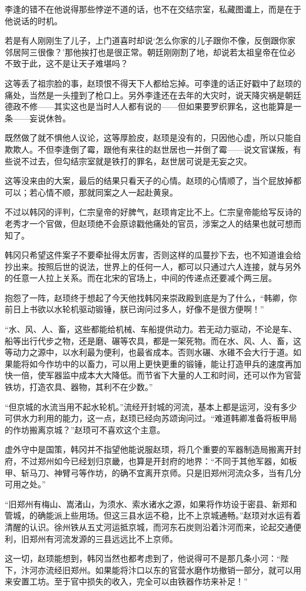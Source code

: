 李逢的错不在他说得那些悖逆不道的话，也不在交结宗室，私藏图谶上，而是在于他说话的时机。

若是有人刚刚生了儿子，上门道喜时却说‘怎么你家的儿子跟你不像，反倒跟你家邻居阿三很像？’那他挨打也是很正常。朝廷刚刚割了地，却说若太祖皇帝在位必不致于此，这不是让天子难堪吗？

这等丢了祖宗脸的事，赵顼恨不得天下人都给忘掉。可李逢的话正好戳中了赵顼的痛处，当然是一头撞到了枪口上。另外李逢还在去年的大灾时，说天降灾祸是朝廷德政不修——其实这也是当时人人都有说的——但如果要罗织罪名，这也能算是一条——妄说休咎。

既然做了就不惧他人议论，这等厚脸皮，赵顼是没有的，只因他心虚，所以只能自欺欺人。不但李逢倒了霉，跟他有来往的赵世居也一并倒了霉——说文官谋叛，有些说不过去，但勾结宗室就是铁打的罪名，赵世居可说是无妄之灾。

这等没来由的大案，最后的结果只看天子的心情。赵顼的心情顺了，当个屁放掉都可以；若心情不顺，那就同案之人一起赴黄泉。

不过以韩冈的评判，仁宗皇帝的好脾气，赵顼肯定比不上。仁宗皇帝能给写反诗的老秀才一个官做，但赵顼绝不会原谅戳他痛处的官员，涉案之人的结果也就可想而知了。

韩冈只希望这件案子不要牵扯得太厉害，否则这样的瓜蔓抄下去，也不知道谁会给抄出来。按照后世的说法，世界上的任何一人，都可以只通过六人连接，就与另外的任意一人拉上关系。而在北宋的官场上，中间的传递点还要减个两三层。

抱怨了一阵，赵顼终于想起了今天他找韩冈来崇政殿到底是为了什么，“韩卿，你前日上书欲以水轮机驱动锻锤，朕已询问过多人，好像不是很方便啊！”

“水、风、人、畜，这些都能给机械、车船提供动力。若无动力驱动，不论是车、船等出行代步之物，还是磨、碾等农具，都是一架死物。而在水、风、人、畜，这等动力之源中，以水利最为便利，也最省成本。否则水碾、水碓不会大行于道。如果能将如今作坊中的以畜力，可以用上更快更重的锻锤，能让打造甲兵的速度再加快一倍，使军器监中成本大大降低。而节省下大量的人工和时间，还可以作为官营铁坊，打造农具、器物，其利不在少数。”

“但京城的水流当用不起水轮机。”流经开封城的河流，基本上都是运河，没有多少可供水力利用的能力，这一点，赵顼已经向苏颂询问过。“难道韩卿准备将板甲局的作坊搬离京城？”赵顼可不喜欢这个主意。

虚外守中是国策，韩冈并不指望他能说服赵顼，将几个重要的军器制造局搬离开封府，不过郑州如今已经划归京畿，也算是开封府的地界：“不同于其他军器，如板甲、斩马刀、神臂弓等作坊，的确不宜离开京师。只是旧郑州河流众多，当有几分可用之处。”

“旧郑州有梅山、嵩渚山，为须水、索水诸水之源，如果将作坊设于密县、新郑和管城，的确能派上些用场。但这三县水运不稳，比不上京城通畅。”赵顼对水运有着清醒的认识。徐州铁从五丈河运抵京城，而河东石炭则沿着汴河而来，论起交通便利，旧郑州有河流发源的三县远远比不上京师。

这一切，赵顼能想到，韩冈当然也都考虑到了，他说得可不是那几条小河：“陛下，汴河亦流经旧郑州。如果能将汴口以东的官营水磨作坊撤销一部分，就可以用来安置工坊。至于官中损失的收入，完全可以由铁器作坊来补足！”

